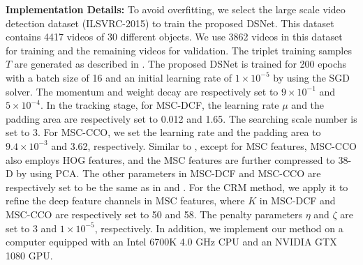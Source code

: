 \documentclass[runningheads]{llncs}
\begin{document}
\textbf{Implementation Details:} To avoid overfitting, we select the large scale video detection dataset (ILSVRC-2015) \cite{ILSVRC} to train the proposed DSNet. This dataset contains 4417 videos of 30 different objects. We use 3862 videos in this dataset for training and the remaining videos for validation. The triplet training samples $T$ are generated as described in \cite{CFCF}. The proposed DSNet is trained for 200 epochs with a batch size of 16 and an initial learning rate of $1\times 10^{-5}$ by using the SGD solver. The momentum and weight decay are respectively set to $9\times 10^{-1}$ and $5\times10^{-4}$. In the tracking stage, for MSC-DCF, the learning rate $\mu$ and the padding area are respectively set to 0.012 and 1.65. The searching scale number is set to 3. For MSC-CCO, we set the learning rate and the padding area to $ 9.4\times 10^{-3}$ and 3.62, respectively. Similar to \cite{ECO}, except for MSC features, MSC-CCO also employs HOG features, and the MSC features are further compressed to 38-D by using PCA. The other parameters in MSC-DCF and MSC-CCO are respectively set to be the same as in \cite{DCFNet} and \cite{ECO}. For the CRM method, we apply it to refine the deep feature channels in MSC features, where $K$ in MSC-DCF and MSC-CCO are respectively set to 50 and 58. The penalty parameters $\eta$ and $\zeta$ are set to 3 and $1\times10^{-5}$, respectively. In addition, we implement our method on a computer equipped with an Intel 6700K 4.0 GHz CPU and an NVIDIA GTX 1080 GPU. \\

\end{document}

